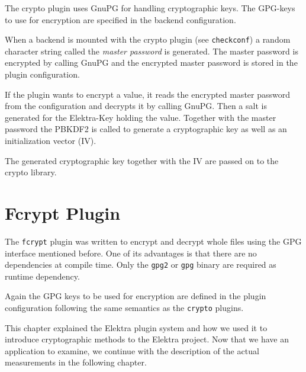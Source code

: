 The crypto plugin uses GnuPG for handling cryptographic keys. The
GPG-keys to use for encryption are specified in the backend
configuration.

When a backend is mounted with the crypto plugin (see
\texttt{checkconf}) a random character string called the \emph{master
password} is generated. The master password is encrypted by calling
GnuPG and the encrypted master password is stored in the plugin
configuration.

If the plugin wants to encrypt a value, it reads the encrypted master
password from the configuration and decrypts it by calling GnuPG. Then a
salt is generated for the Elektra-Key holding the value. Together with
the master password the PBKDF2 is called to generate a cryptographic key
as well as an initialization vector (IV).

The generated cryptographic key together with the IV are passed on to
the crypto library.

\section{Fcrypt Plugin}\label{fcrypt-plugin}

The \texttt{fcrypt} plugin was written to encrypt and decrypt whole files using the GPG interface mentioned before.
One of its advantages is that there are no dependencies at compile time.
Only the \texttt{gpg2} or \texttt{gpg} binary are required as runtime dependency.

Again the GPG keys to be used for encryption are defined in the plugin configuration following the same semantics as the \texttt{crypto} plugins.

This chapter explained the Elektra plugin system and how we used it to introduce cryptographic methods to the Elektra project.
Now that we have an application to examine, we continue with the description of the actual measurements in the following chapter.
